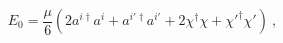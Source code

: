 \begin{equation}
E_0 = \frac{\mu}{6}
     ( 2 a^{i \dagger} a^i + a^{i' \dagger} a^{i'}
       + 2 \chi^\dagger \chi + \chi'^\dagger \chi' )~,
\label{zero-h}
\end{equation}

